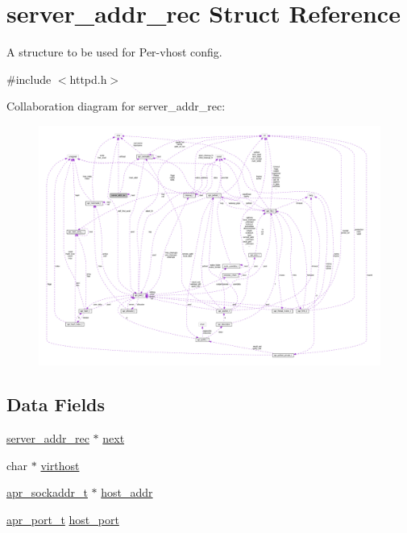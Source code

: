 \hypertarget{structserver__addr__rec}{}\section{server\+\_\+addr\+\_\+rec Struct Reference}
\label{structserver__addr__rec}


A structure to be used for Per-\/vhost config.  




{\ttfamily \#include $<$httpd.\+h$>$}



Collaboration diagram for server\+\_\+addr\+\_\+rec\+:
\nopagebreak
\begin{figure}[H]
\begin{center}
\leavevmode
\includegraphics[width=350pt]{structserver__addr__rec__coll__graph}
\end{center}
\end{figure}
\subsection*{Data Fields}
\begin{DoxyCompactItemize}
\item 
\hyperlink{structserver__addr__rec}{server\+\_\+addr\+\_\+rec} $\ast$ \hyperlink{structserver__addr__rec_a5b8b246fe0879f9f40d0d7492e9ce8e2}{next}
\item 
char $\ast$ \hyperlink{structserver__addr__rec_aaf703f04f5299efa3a1e81d32bfa9338}{virthost}
\item 
\hyperlink{structapr__sockaddr__t}{apr\+\_\+sockaddr\+\_\+t} $\ast$ \hyperlink{structserver__addr__rec_ad25f9e42277e5f540f98ad1998d7548b}{host\+\_\+addr}
\item 
\hyperlink{group__apr__network__io_gaa670a71960f6eb4fe0d0de2a1e7aba03}{apr\+\_\+port\+\_\+t} \hyperlink{structserver__addr__rec_a498bb8ff02743204f9c00865a089de9a}{host\+\_\+port}
\end{DoxyCompactItemize}


